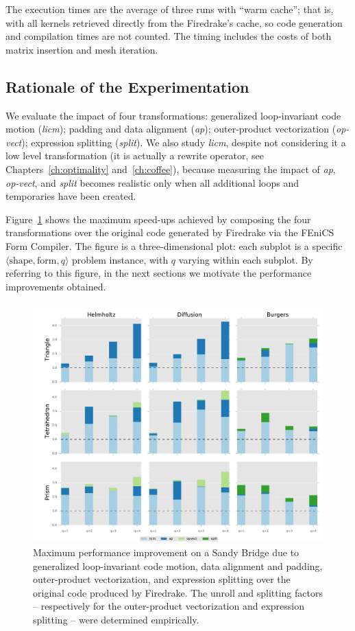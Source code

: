 The execution times are the average of three runs with ``warm cache''; that is, with all kernels retrieved directly from the Firedrake's cache, so code generation and compilation times are not counted. The timing includes the costs of both matrix insertion and mesh iteration. 

\subsection{Rationale of the Experimentation}
We evaluate the impact of four transformations: generalized loop-invariant code motion (\emph{licm}); padding and data alignment (\emph{ap}); outer-product vectorization (\emph{op-vect}); expression splitting (\emph{split}). We also study \emph{licm}, despite not considering it a low level transformation (it is actually a rewrite operator, see Chapters~\ref{ch:optimality} and~\ref{ch:coffee}), because measuring the impact of \emph{ap}, \emph{op-vect}, and \emph{split} becomes realistic only when all additional loops and temporaries have been created.

Figure~\ref{fig:coffee-individual-res} shows the maximum speed-ups achieved by composing the four transformations over the original code generated by Firedrake via the FEniCS Form Compiler. The figure is a three-dimensional plot: each subplot is a specific ${\langle} \textrm{shape}, \mathrm{form}, q {\rangle}$ problem instance, with $q$ varying within each subplot. By referring to this figure, in the next sections we motivate the performance improvements obtained.

\begin{figure}[t]
\centerline{\includegraphics[scale=0.45]{lowlevelopt/perf-results/individual/plot_sb}}
\caption{Maximum performance improvement on a Sandy Bridge due to generalized loop-invariant code motion, data alignment and padding, outer-product vectorization, and expression splitting over the original code produced by Firedrake. The unroll and splitting factors -- respectively for the outer-product vectorization and expression splitting -- were determined empirically.}
\label{fig:coffee-individual-res}
\end{figure}


